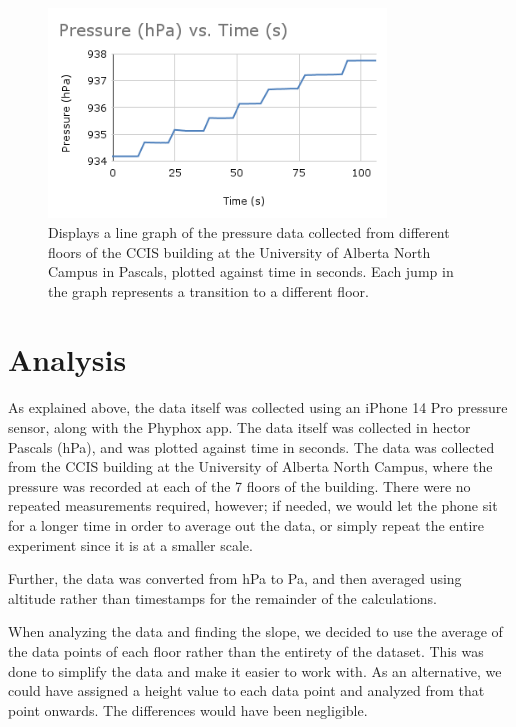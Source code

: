 \documentclass[12pt]{article}
\begin{document}
\begin{figure}[h]
    \centering
    \includegraphics[width=0.8\textwidth]{Pressure-Time.png}
    \caption{Displays a line graph of the pressure data collected from different floors of the CCIS building
    at the University of Alberta North Campus in Pascals, plotted against time in seconds. Each jump in the graph represents a
    transition to a different floor.}
    \label{fig:pressure-time}
\end{figure}

\section{Analysis}

As explained above, the data itself was collected using an iPhone 14 Pro pressure sensor,
along with the Phyphox app. The data itself was collected in hector Pascals (hPa), and was
plotted against time in seconds. The data was collected from the CCIS building at the University of Alberta North Campus,
where the pressure was recorded at each of the 7 floors of the building. There were no repeated measurements required,
however; if needed, we would let the phone sit for a longer time in order to average out the data, or simply repeat the entire experiment since
it is at a smaller scale.

Further, the data was converted from hPa to Pa, and then averaged using altitude rather than timestamps for the remainder of the calculations.

When analyzing the data and finding the slope, we decided to use the average of the data points of each floor rather than the entirety of the dataset.
This was done to simplify the data and make it easier to work with. As an alternative, we could have assigned a height value to each data point and
analyzed from that point onwards. The differences would have been negligible.
\end{document}
